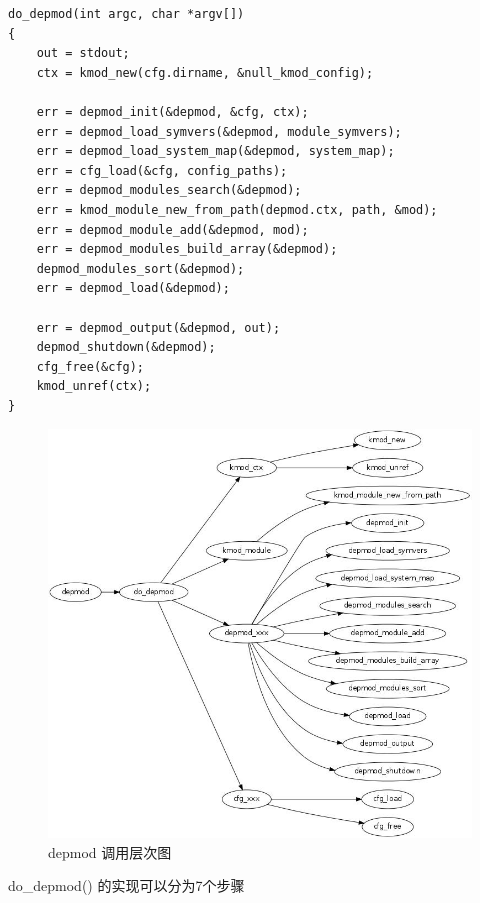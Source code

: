 \documentclass[11pt,a4paper]{article}
\makeatletter
\def\maxwidth{\ifdim\Gin@nat@width>\linewidth\linewidth
\else\Gin@nat@width\fi}
\let\Oldincludegraphics\includegraphics
\renewcommand{\includegraphics}[1]{\Oldincludegraphics[width=\maxwidth]{#1}}
\makeatother
\begin{document}
{\begin{shaded}\begin{verbatim}
do_depmod(int argc, char *argv[])
{
    out = stdout;       
    ctx = kmod_new(cfg.dirname, &null_kmod_config);

    err = depmod_init(&depmod, &cfg, ctx);
    err = depmod_load_symvers(&depmod, module_symvers);
    err = depmod_load_system_map(&depmod, system_map);
    err = cfg_load(&cfg, config_paths);
    err = depmod_modules_search(&depmod);
    err = kmod_module_new_from_path(depmod.ctx, path, &mod);
    err = depmod_module_add(&depmod, mod);
    err = depmod_modules_build_array(&depmod);
    depmod_modules_sort(&depmod);
    err = depmod_load(&depmod);

    err = depmod_output(&depmod, out);
    depmod_shutdown(&depmod);
    cfg_free(&cfg);
    kmod_unref(ctx);
}
\end{verbatim}\end{shaded}}
\begin{figure}[htbp]
\centering
\includegraphics{./figures/depmod.jpg}
\caption{depmod 调用层次图}
\end{figure}

do\_depmod() 的实现可以分为7个步骤
\end{document}
